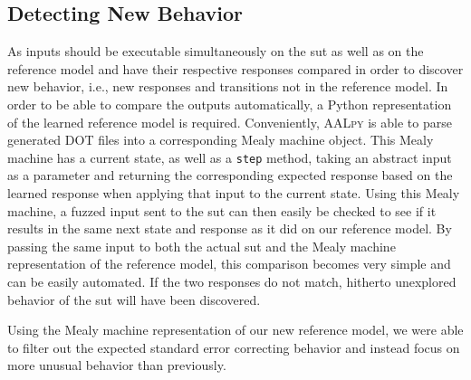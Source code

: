 \subsection{Detecting New Behavior} \label{subsec:state_detect}
As inputs should be executable simultaneously on the \ac{sut} as well as on the reference model and have their respective responses compared in order to discover new behavior, i.e., new responses and transitions not in the reference model. In order to be able to compare the outputs automatically, a Python representation of the learned reference model is required. Conveniently, \textsc{AALpy} is able to parse generated DOT files into a corresponding Mealy machine object. This Mealy machine has a current state, as well as a \texttt{step} method, taking an abstract input as a parameter and returning the corresponding expected response based on the learned response when applying that input to the current state. Using this Mealy machine, a fuzzed input sent to the \ac{sut} can then easily be checked to see if it results in the same next state and response as it did on our reference model. By passing the same input to both the actual \ac{sut} and the Mealy machine representation of the reference model, this comparison becomes very simple and can be easily automated. If the two responses do not match, hitherto unexplored behavior of the \ac{sut} will have been discovered. 

Using the Mealy machine representation of our new reference model, we were able to filter out the expected standard error correcting behavior and instead focus on more unusual behavior than previously. 

